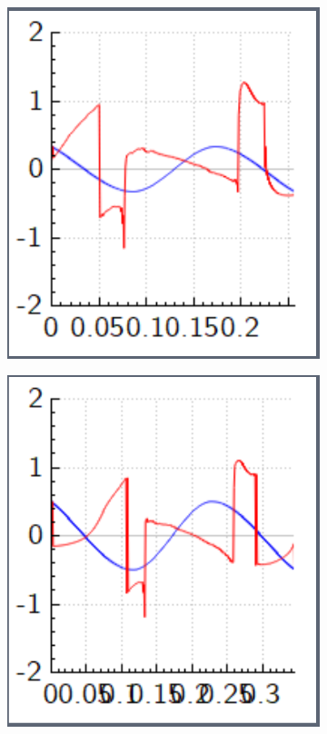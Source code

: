 \documentclass[a4paper, twocolumn]{revtex4-1}
\begin{document}
\begin{figure}
	\begin{subfigure}{0.4\columnwidth}
		\includegraphics[width=\columnwidth]{graphics/similar_solutions/T02563k3A033.PNG}
	\end{subfigure}
	\begin{subfigure}{0.4\columnwidth}
		\includegraphics[width=\columnwidth]{graphics/similar_solutions/T03450k3A050.PNG}

\end{subfigure}
\end{figure}
\end{document}
